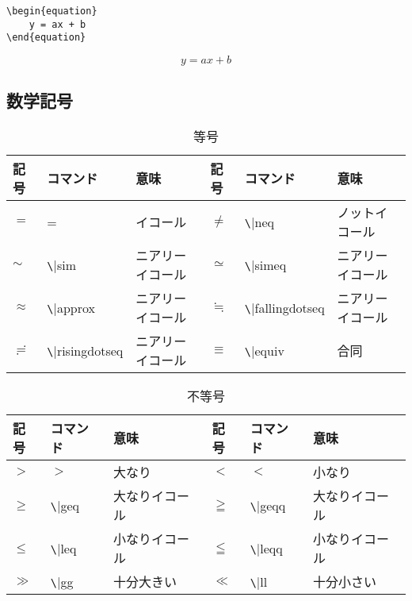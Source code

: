 \documentclass[11pt,a4paper]{jsarticle}
\begin{document}
\begin{lstlisting}
\begin{equation}
	y = ax + b
\end{equation}
\end{lstlisting}

\begin{equation}
	y = ax + b
\end{equation}


\subsection{数学記号}

\begin{table} [ h ]
\caption{等号}
	\begin{center}
	\begin{tabular}{| l | l | l || l | l | l |} \hline
		記号 & コマンド & 意味 & 記号 & コマンド & 意味 \\ \hline
		$=$ & = & イコール & $\neq$ & \verb|\|neq & ノットイコール \\ \hline
		$\sim$ & \verb|\|sim & ニアリーイコール & $\simeq$ & \verb|\|simeq & ニアリーイコール \\ \hline
		$\approx$ & \verb|\|approx & ニアリーイコール & $\fallingdotseq$ & \verb|\|fallingdotseq & ニアリーイコール \\ \hline
		$\risingdotseq$ & \verb|\|risingdotseq & ニアリーイコール & $\equiv$ & \verb|\|equiv & 合同 \\ \hline
	\end{tabular}
	\end{center}
\end{table}

\begin{table} [ h ]
\caption{不等号}
	\begin{center}
	\begin{tabular}{| l | l | l || l | l | l |} \hline
		記号 & コマンド & 意味 & 記号 & コマンド & 意味 \\ \hline
		$>$ & $>$ & 大なり & $<$ & $<$ & 小なり \\ \hline
		$\geq$ & \verb|\|geq & 大なりイコール & $\geqq $ & \verb|\|geqq & 大なりイコール \\ \hline
		$\leq$ & \verb|\|leq & 小なりイコール & $\leqq $ & \verb|\|leqq & 小なりイコール \\ \hline
		$\gg$ & \verb|\|gg & 十分大きい & $\ll$ & \verb|\|ll & 十分小さい \\ \hline
	\end{tabular}
	\end{center}
\end{table}
\end{document}

